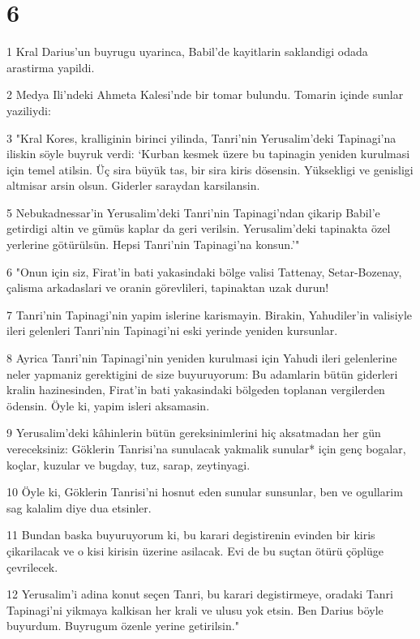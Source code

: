 \chapter{6}

\par 1 Kral Darius'un buyrugu uyarinca, Babil'de kayitlarin saklandigi odada arastirma yapildi.
\par 2 Medya Ili'ndeki Ahmeta Kalesi'nde bir tomar bulundu. Tomarin içinde sunlar yaziliydi:
\par 3 "Kral Kores, kralliginin birinci yilinda, Tanri'nin Yerusalim'deki Tapinagi'na iliskin söyle buyruk verdi: `Kurban kesmek üzere bu tapinagin yeniden kurulmasi için temel atilsin. Üç sira büyük tas, bir sira kiris dösensin. Yüksekligi ve genisligi altmisar arsin olsun. Giderler saraydan karsilansin.
\par 5 Nebukadnessar'in Yerusalim'deki Tanri'nin Tapinagi'ndan çikarip Babil'e getirdigi altin ve gümüs kaplar da geri verilsin. Yerusalim'deki tapinakta özel yerlerine götürülsün. Hepsi Tanri'nin Tapinagi'na konsun.'"
\par 6 "Onun için siz, Firat'in bati yakasindaki bölge valisi Tattenay, Setar-Bozenay, çalisma arkadaslari ve oranin görevlileri, tapinaktan uzak durun!
\par 7 Tanri'nin Tapinagi'nin yapim islerine karismayin. Birakin, Yahudiler'in valisiyle ileri gelenleri Tanri'nin Tapinagi'ni eski yerinde yeniden kursunlar.
\par 8 Ayrica Tanri'nin Tapinagi'nin yeniden kurulmasi için Yahudi ileri gelenlerine neler yapmaniz gerektigini de size buyuruyorum: Bu adamlarin bütün giderleri kralin hazinesinden, Firat'in bati yakasindaki bölgeden toplanan vergilerden ödensin. Öyle ki, yapim isleri aksamasin.
\par 9 Yerusalim'deki kâhinlerin bütün gereksinimlerini hiç aksatmadan her gün vereceksiniz: Göklerin Tanrisi'na sunulacak yakmalik sunular* için genç bogalar, koçlar, kuzular ve bugday, tuz, sarap, zeytinyagi.
\par 10 Öyle ki, Göklerin Tanrisi'ni hosnut eden sunular sunsunlar, ben ve ogullarim sag kalalim diye dua etsinler.
\par 11 Bundan baska buyuruyorum ki, bu karari degistirenin evinden bir kiris çikarilacak ve o kisi kirisin üzerine asilacak. Evi de bu suçtan ötürü çöplüge çevrilecek.
\par 12 Yerusalim'i adina konut seçen Tanri, bu karari degistirmeye, oradaki Tanri Tapinagi'ni yikmaya kalkisan her krali ve ulusu yok etsin. Ben Darius böyle buyurdum. Buyrugum özenle yerine getirilsin."
